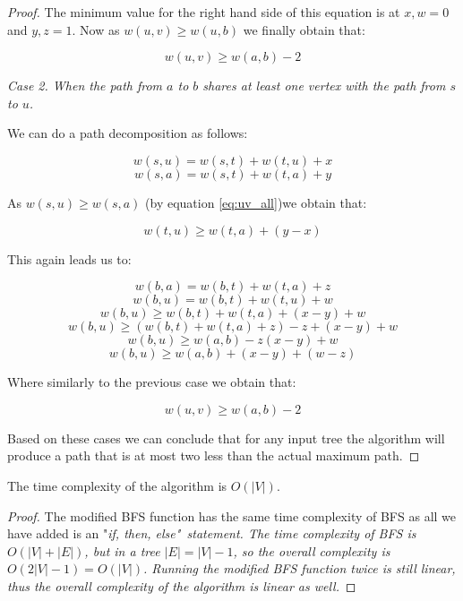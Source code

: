 \begin{proof}
The minimum value for the right hand side of this equation is at $x, w = 0$ and $y, z = 1$. Now as $w(u, v) \ge w(u, b)$ we finally obtain that:

$$ w(u, v) \ge w(a, b) - 2 $$


{\em Case 2. When the path from $a$ to $b$ shares at least one vertex with the path from $s$ to $u$.}


We can do a path decomposition as follows:

$$ w(s, u) = w(s, t) + w(t, u) + x $$
$$ w(s, a) = w(s, t) + w(t, a) + y $$

As $w(s, u) \ge w(s, a)$ (by equation \ref{eq:uv_all})we obtain that:

$$ w(t, u) \ge w(t, a) + (y - x) $$

This again leads us to:

$$ w(b, a) = w(b, t) + w(t, a) + z  $$
$$ w(b, u) = w(b, t) + w(t, u) + w  $$
$$ w(b, u) \ge w(b, t) + w(t, a) + (x - y) + w $$
$$ w(b, u) \ge (w(b, t) + w(t, a) + z) - z + (x - y) + w $$
$$ w(b, u) \ge w(a, b) - z (x - y) + w $$
$$ w(b, u) \ge w(a, b) + (x - y) + (w - z) $$

Where similarly to the previous case we obtain that:

$$ w(u, v) \ge w(a, b) - 2 $$


Based on these cases we can conclude that for any input tree the algorithm will produce a path that is at most two less than the actual maximum path.




\end{proof}

\begin{lem} The time complexity of the algorithm is $O(|V|)$. \end{lem}

\begin{proof}
    The modified BFS function has the same time complexity of BFS as all we have added is an "\em if, then, else\em"~statement. The time complexity of BFS is $O(|V| + |E|)$, but in a tree $|E| = |V| - 1$, so the overall complexity is $O(2|V| - 1) = O(|V|)$. 
    Running the modified BFS function twice is still linear, thus the overall complexity of the algorithm is linear as well.
\end{proof}

